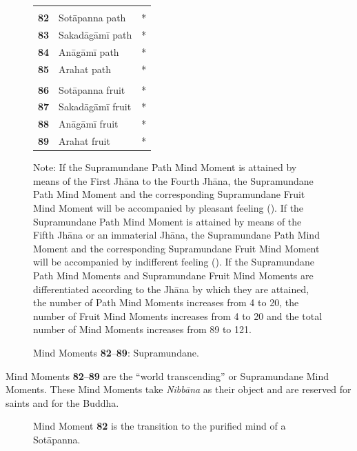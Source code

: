 \begin{figure}[H]
\setlength{\tabcolsep}{0pt}
\renewcommand{\arraystretch}{1.1}

\begin{center}
\noindent\begin{tabular}{P{.05\textwidth}L{0.25\textwidth}C{.05\textwidth}}
\toprule
{} \\
\textbf{82} & Sotāpanna path & * \\
\textbf{83} & Sakadāgāmī path & * \\
\textbf{84} & Anāgāmī path & * \\
\textbf{85} & Arahat path & * \\
\midrule
{} \\
\textbf{86} & Sotāpanna fruit & * \\
\textbf{87} & Sakadāgāmī fruit & * \\
\textbf{88} & Anāgāmī fruit & * \\
\textbf{89} & Arahat fruit & * \\
\bottomrule
\end{tabular}
\end{center}

{\small \noindent * Note: If the Supramundane Path Mind Moment is attained by means of the First Jhāna to the Fourth Jhāna, the Supramundane Path Mind Moment and the corresponding Supramundane Fruit Mind Moment will be accompanied by pleasant feeling (\smiley). If the Supramundane Path Mind Moment is attained by means of the Fifth Jhāna or an immaterial Jhāna, the Supramundane Path Mind Moment and the corresponding Supramundane Fruit Mind Moment will be accompanied by indifferent feeling (\neutral). If the Supramundane Path Mind Moments and Supramundane Fruit Mind Moments are differentiated according to the Jhāna by which they are attained, the number of Path Mind Moments increases from 4 to 20, the number of Fruit Mind Moments increases from 4 to 20 and the total number of Mind Moments increases from 89 to 121.}

\caption{Mind Moments \textbf{82}--\textbf{89}: Supramundane.}
\label{fig:82to89}
\end{figure}

Mind Moments \textbf{82}--\textbf{89} are the “world transcending” or Supramundane Mind Moments. These Mind Moments take \textit{Nibbāna} as their object and are reserved for saints and for the Buddha.

\begin{figure}[H]
\centering

\caption{Mind Moment \textbf{82} is the transition to the purified mind of a Sotāpanna.}
\label{fig:Magga}
\end{figure}

